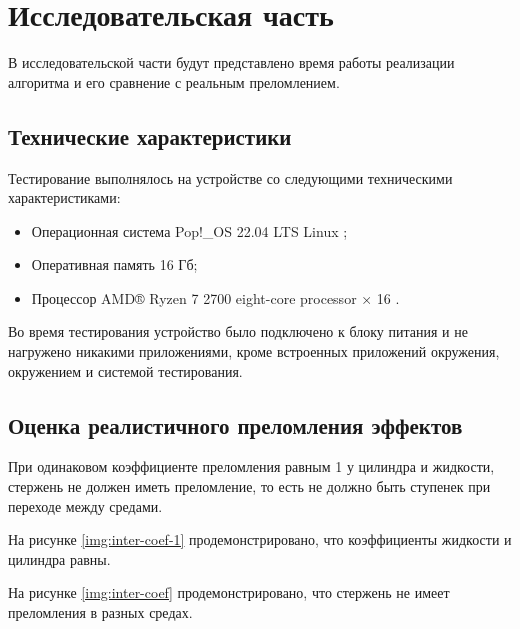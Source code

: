 \chapter{Исследовательская часть}
В исследовательской части будут представлено время работы реализации алгоритма и его сравнение с реальным преломлением.
\section{Технические характеристики}
Тестирование выполнялось на устройстве со следующими техническими характеристиками:
\begin{itemize}
	\item Операционная система Pop!\_OS 22.04 LTS \cite{ubuntu} Linux \cite{linux};
	\item Оперативная память 16 Гб;
	\item Процессор AMD® Ryzen 7 2700 eight-core processor × 16 \cite{amd}.
\end{itemize}

Во время тестирования устройство было подключено к блоку питания и не нагружено никакими приложениями, кроме встроенных приложений окружения, окружением и системой тестирования.

\section{Оценка реалистичного преломления эффектов}

При одинаковом коэффициенте преломления равным 1 у цилиндра и жидкости, стержень не должен иметь преломление, то есть не должно быть ступенек при переходе между средами.

На рисунке \ref{img:inter-coef-1} продемонстрировано, что коэффициенты жидкости и цилиндра равны. 



\begin{figure}[ht!]
\end{figure}
\FloatBarrier

На рисунке \ref{img:inter-coef} продемонстрировано, что стержень не имеет преломления в разных средах. 

